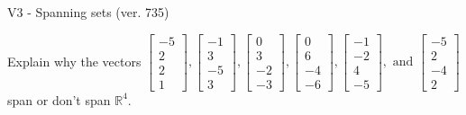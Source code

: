 \begin{exercise}
  \begin{exerciseTitle}V3 - Spanning sets (ver. 735)\end{exerciseTitle}
  \begin{exerciseStatement}
    Explain why the vectors \(\left[\begin{array}{r}
-5 \\
2 \\
2 \\
1
\end{array}\right] , \left[\begin{array}{r}
-1 \\
3 \\
-5 \\
3
\end{array}\right] , \left[\begin{array}{r}
0 \\
3 \\
-2 \\
-3
\end{array}\right] , \left[\begin{array}{r}
0 \\
6 \\
-4 \\
-6
\end{array}\right] , \left[\begin{array}{r}
-1 \\
-2 \\
4 \\
-5
\end{array}\right] , \text{ and } \left[\begin{array}{r}
-5 \\
2 \\
-4 \\
2
\end{array}\right]\) span or don't span \(\mathbb{R}^4\). 
	



\end{exerciseStatement}
\end{exercise}
